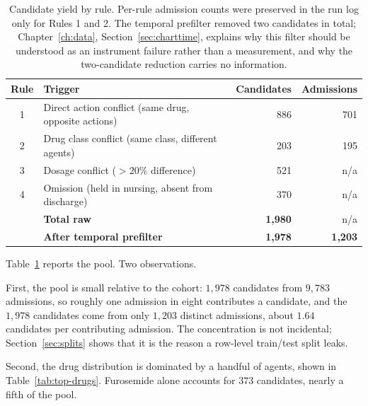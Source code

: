 \begin{table}[t]
\centering
\small
\begin{tabular}{clrr}
\toprule
\textbf{Rule} & \textbf{Trigger} & \textbf{Candidates} & \textbf{Admissions} \\
\midrule
1 & Direct action conflict (same drug, opposite actions) & 886   & 701 \\
2 & Drug class conflict (same class, different agents)   & 203   & 195 \\
3 & Dosage conflict ($>20\%$ difference)                 & 521   & n/a \\
4 & Omission (held in nursing, absent from discharge)    & 370   & n/a \\
\midrule
  & \textbf{Total raw}                                   & \textbf{1,980} & n/a \\
  & \textbf{After temporal prefilter}                    & \textbf{1,978} & \textbf{1,203} \\
\bottomrule
\end{tabular}
\caption{Candidate yield by rule. Per-rule admission counts were preserved in
the run log only for Rules 1 and 2. The temporal prefilter removed two
candidates in total; Chapter~\ref{ch:data}, Section~\ref{sec:charttime},
explains why this filter should be understood as an instrument failure rather
than a measurement, and why the two-candidate reduction carries no information.}
\label{tab:yield-rules}
\end{table}

Table~\ref{tab:yield-rules} reports the pool. Two observations.

First, the pool is small relative to the cohort: $1{,}978$ candidates from
$9{,}783$ admissions, so roughly one admission in eight contributes a candidate,
and the $1{,}978$ candidates come from only $1{,}203$ distinct admissions, about
$1.64$ candidates per contributing admission. The concentration is not
incidental; Section~\ref{sec:splits} shows that it is the reason a row-level
train/test split leaks.

Second, the drug distribution is dominated by a handful of agents, shown in
Table~\ref{tab:top-drugs}. Furosemide alone accounts for $373$ candidates,
nearly a fifth of the pool.

